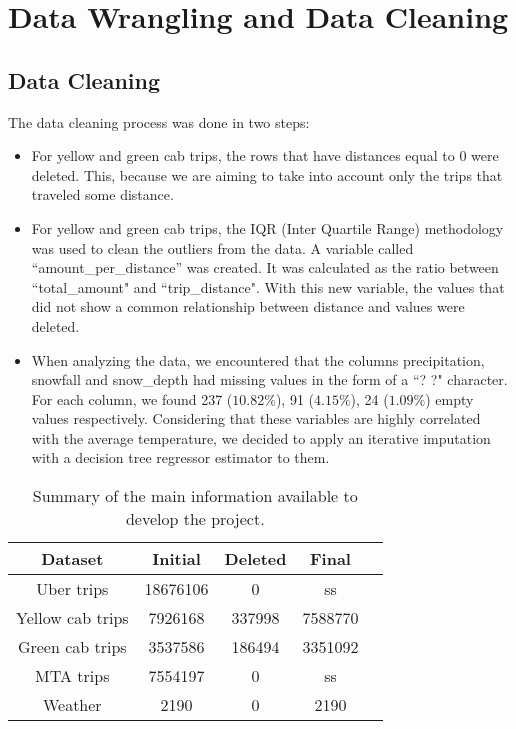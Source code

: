\section{Data Wrangling and Data Cleaning}
\label{subsec:dataCl}

\subsection{Data Cleaning}

The data cleaning process was done in two steps:

\begin{itemize}
\item For yellow and green cab trips, the rows that have distances equal to $0$ were deleted. This, because we are aiming to take into account only the trips that traveled some distance.
\item For yellow and green cab trips, the IQR (Inter Quartile Range) methodology was used to clean the outliers from the data. A variable called ``amount\_per\_distance'' was created. It was calculated as the ratio between ``total\_amount" and ``trip\_distance". With this new variable, the values that did not show a common relationship between distance and values were deleted.
\item When analyzing the data, we encountered that the columns precipitation, snowfall and snow\_depth had missing values in the form of a ``? ?" character. For each column, we found 237 ($10.82\%$), 91 ($4.15\%$), 24 ($1.09\%$) empty values respectively. Considering that these variables are highly correlated with the average temperature, we decided to apply an iterative imputation with a decision tree regressor estimator to them.
\end{itemize}

\begin{table}[h]
\begin{center}
\label{tab:dataset}
\begin{tabular}{|c|c|c|c|c|}
\hline
\textbf{Dataset} & \textbf{Initial} & \textbf{Deleted} & \textbf{Final}  \\
\hline
 Uber trips &  18676106	& 0  & ss\\
Yellow cab trips & 7926168 & 337998 & 7588770\\
Green cab trips &  3537586 & 186494 & 3351092\\
MTA trips & 7554197	&  0	& ss\\
Weather & 	2190 &  0 & 2190\\
\hline
\end{tabular}
 \caption{Summary of the main information available to develop the project.}
\end{center}
\end{table}

